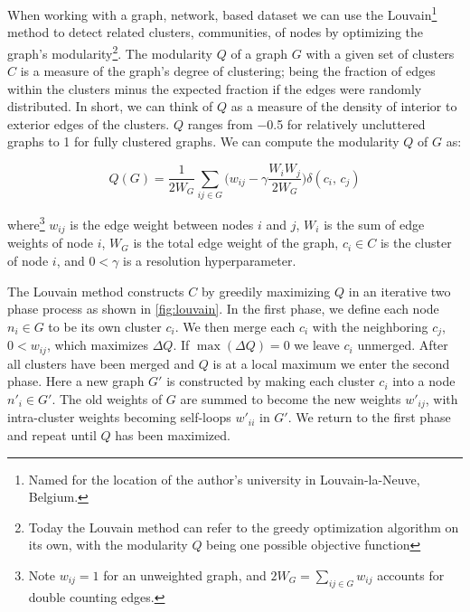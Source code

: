 When working with a graph, \ie network, based dataset
we can use the Louvain\footnote{Named for the location of the author's university in Louvain-la-Neuve, Belgium.} method \cite{louvain}
to detect related clusters, \ie communities,
of nodes by optimizing the graph's modularity\footnote{Today the Louvain method can refer to the greedy optimization algorithm on its own,
with the modularity $Q$ being one possible objective function}.
The modularity $Q$ of a graph $G$ with a given set of clusters $C$
is a measure of the graph's degree of clustering;
being the fraction of edges within the clusters
minus the expected fraction if the edges were randomly distributed.
In short, we can think of $Q$ as a measure of
the density of interior to exterior edges of the clusters.
$Q$ ranges from \num{-0.5} for relatively uncluttered graphs
to \num{1} for fully clustered graphs.
We can compute the modularity $Q$ of $G$ as:

\begin{equation} \label{eq:unsupervised:louvain:modularity}
Q\left(G\right) = \frac{1}{2 W_{G}} \sum_{ij \in G} \bigg(w_{ij} - \gamma \frac{W_{i} W_{j}}{2 W_{G}}\bigg) \delta\left(c_{i},\,c_{j}\right)
\end{equation}

\noindent where\footnote{Note $w_{ij}=1$ for an unweighted graph, and $2 W_{G} = \sum_{ij \in G} w_{ij}$ accounts for double counting edges.}
$w_{ij}$ is the edge weight between nodes $i$ and $j$,
$W_{i}$ is the sum of edge weights of node $i$,
$W_{G}$ is the total edge weight of the graph,
$c_{i} \in C$ is the cluster of node $i$,
and $0 < \gamma$ is a resolution hyperparameter.

The Louvain method constructs $C$ by greedily maximizing $Q$ in an iterative two phase process as shown in \cref{fig:louvain}.
In the first phase, we define each node $n_{i} \in G$ to be its own cluster $c_{i}$.
We then merge each $c_{i}$ with the neighboring $c_{j}$, $0 < w_{ij}$, which maximizes $\Delta Q$.
If $\max\left(\Delta Q\right) = 0$ we leave $c_{i}$ unmerged.
After all clusters have been merged and $Q$ is at a local maximum we enter the second phase.
Here a new graph $G'$ is constructed by making each cluster $c_{i}$ into a node $n'_{i} \in G'$.
The old weights of $G$ are summed to become the new weights $w'_{ij}$,
with intra-cluster weights becoming self-loops $w'_{ii}$ in $G'$.
We return to the first phase and repeat until $Q$ has been maximized.

